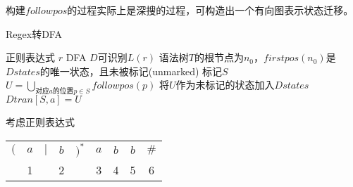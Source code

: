 构建$followpos$的过程实际上是深搜的过程，可构造出一个有向图表示状态迁移。
\begin{algorithm}[H]
\centering
\caption{Regex转DFA}
\begin{algorithmic}[1]
\Require 正则表达式 $r$
\Ensure DFA $D$可识别$L(r)$
\State 语法树$T$的根节点为$n_0$，$firstpos(n_0)$是$Dstates$的唯一状态，且未被标记(unmarked)
\State 标记$S$
\State $U=\bigcup_{\text{对应}a\text{的位置}p\in S} followpos(p)$
\State 将$U$作为未标记的状态加入$Dstates$
\EndIf
\State $Dtran[S,a]=U$
\EndFor
\EndWhile
\end{algorithmic}
\end{algorithm}
\begin{example}
考虑正则表达式
\begin{tabular}{ccccccccc}
$($ & $a$ & $|$ & $b$ & $)^*$ & $a$ & $b$ & $b$ & $\#$\\
 & 1 & & 2 & & 3 & 4 & 5 & 6
\end{tabular}
\end{example}
